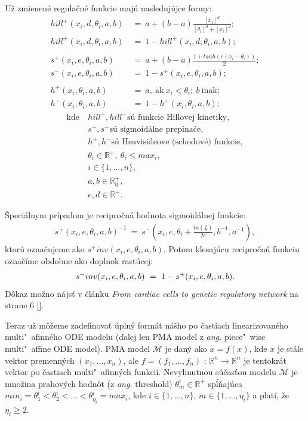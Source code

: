 \documentclass[11pt,final,oneside]{fithesis}
\begin{document}
U\v z zmienen\'e regula\v cn\'e funkcie maj\'u nasleduj\'ujce formy:
\begin{align*}
hill^+(x_i, d, \theta_i, a, b) &\ = \ a + (b - a)\frac{[x_i]^d}{[\theta_i]^d + [x_i]^d};\\
hill^+(x_i, d, \theta_i, a, b) &\ = \ 1 - hill^+(x_i, d, \theta_i, a, b);\\
\\
s^+(x_i, e, \theta_i, a, b) &\ = \ a + (b - a)\frac{1 + tanh(e(x_i - \theta_i))}{2};\\
s^-(x_i, e, \theta_i, a, b) &\  = \ 1 - s^+(x_i, e, \theta_i, a, b);\\
\\
h^+(x_i,\theta_i,a,b) &\ = \ a,\ \textrm{ak}\ x_i < \theta_i;\ b\ \textrm{inak};\\
h^-(x_i,\theta_i,a,b) &\ = \ 1 - h^+(x_i,\theta_i,a,b);
\end{align*}
\begin{align*}
\textrm{kde}\ &hill^+, hill^- \textrm{s\'u funkcie Hillovej kinetiky,}\\
&s^+, s^- \textrm{s\'u sigmoid\'alne prep\'ina\v ce},\\
&h^+, h^- \textrm{s\'u Heavisideove (schodov\'e) funkcie},\\
&\theta_i \in \mathbb{R}^+, \ \theta_i \leq max_i,\\
&i \in \{1,\dots{},n\},\\
&a, b \in \mathbb{R}_0^+,\\
&e, d \in \mathbb{R}^+.
\end{align*}

\noindent\v Speci\'alnym pr\'ipadom je recipro\v cn\'a hodnota sigmoid\'alnej funkcie:
\begin{align*}
s^+(x_i, e, \theta_i, a, b)^{-1} \ = \ s^-(x_i, e, \theta_i + \frac{ln(\frac{a}{b})}{2e}, b^{-1}, a^{-1}),
\end{align*}
ktor\'u ozna\v cujeme ako $s^+inv(x_i, e, \theta_i, a, b)$. Potom klesaj\'ucu recipro\v cn\'u funkciu ozna\v c\'ime obdobne ako doplnok rast\'ucej:
\begin{align*}
\centerline{$s^-inv(x_i, e, \theta_i, a, b) \ = \ 1 - s^+(x_i, e, \theta_i, a, b)$.}
\end{align*}D\^ okaz mo\v zno n\'ajs\v t v \v cl\'anku \textit{From cardiac cells to genetic regulatory network} na strane 6 [].

Teraz u\v z m\^ o\v zeme zadefinova\v t \'upln\'y form\'at n\'a\v sho po \v castiach linearizovan\'eho multi"~a\-fin\-n\'eho ODE modelu 
(\v dalej len PMA model z \textit{ang.} piece"~wise multi"~affine ODE model). PMA model $\mathcal{M}$ je dan\'y ako $\dot{x} = f(x)$, 
kde $x$ je st\'ale vektor premenn\'ych $(x_1,\dots{},x_n)$, ale $f = (f_1,\dots{},f_n)$ : $\mathbb{R}^n \rightarrow \mathbb{R}^n$ je tentokr\'at vektor 
po \v castiach multi"~afinn\'ych funkci\'i. Nevyhnutnou s\'u\v cas\v tou modelu $\mathcal{M}$ je mno\v zina prahov\'ych hodn\^ ot (z \textit{ang.} threshold)
$\theta_m^i \in \mathbb{R}^+$ sp\'l\v naj\'uca $min_i = \theta_1^i < \theta_2^i < \dots{} < \theta_{\eta_i}^i = max_i$, kde $i \in \{1,\dots{},n\}$, 
$m \in \{1,\dots{},\eta_i\}$ a plat\'i, \v ze $\eta_i \geq 2$.
\end{document}
